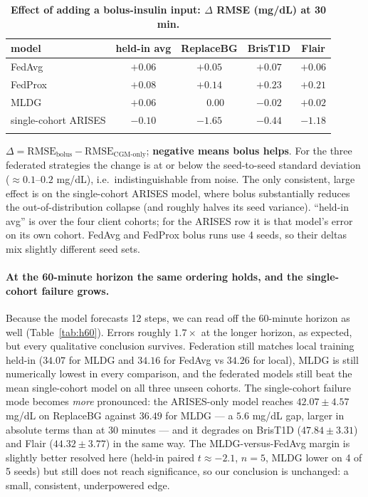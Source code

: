 \documentclass[10pt,letterpaper]{article}
\newlength\savedwidth
\newcommand\thickhline{\noalign{\global\savedwidth\arrayrulewidth\global\arrayrulewidth 2pt}%
\hline
\noalign{\global\arrayrulewidth\savedwidth}}
\begin{document}
\begin{table}[!ht]
\centering
\captionsetup{justification=centering,singlelinecheck=on}
\caption{\bf Effect of adding a bolus-insulin input: $\Delta$ RMSE (mg/dL) at 30 min.}
\label{tab:bolus}
\begin{tabular}{lcccc}
\thickhline
model & held-in avg & ReplaceBG & BrisT1D & Flair \\
\hline
FedAvg  & $+0.06$ & $+0.05$ & $+0.07$ & $+0.06$ \\
FedProx & $+0.08$ & $+0.14$ & $+0.23$ & $+0.21$ \\
MLDG    & $+0.06$ & $\phantom{+}0.00$ & $-0.02$ & $+0.02$ \\
\hline
single-cohort ARISES & $-0.10$ & $\mathbf{-1.65}$ & $\mathbf{-0.44}$ & $\mathbf{-1.18}$ \\
\thickhline
\end{tabular}
\begin{center}
{\small $\Delta = \text{RMSE}_{\text{bolus}} - \text{RMSE}_{\text{CGM-only}}$;
\textbf{negative means bolus helps}. For the three federated strategies the change
is at or below the seed-to-seed standard deviation ($\approx 0.1$--$0.2$ mg/dL),
i.e.\ indistinguishable from noise. The only consistent, large effect is on the
single-cohort ARISES model, where bolus substantially reduces the
out-of-distribution collapse (and roughly halves its seed variance). ``held-in
avg'' is over the four client cohorts; for the ARISES row it is that model's error
on its own cohort. FedAvg and FedProx bolus runs use 4 seeds, so their deltas mix
slightly different seed sets.}
\end{center}
\end{table}

\paragraph{At the 60-minute horizon the same ordering holds, and the
single-cohort failure grows.} Because the model forecasts 12 steps, we can read
off the 60-minute horizon as well (Table~\ref{tab:h60}). Errors roughly
$1.7\times$ at the longer horizon, as expected, but every qualitative conclusion
survives. Federation still matches local training held-in ($34.07$ for MLDG and
$34.16$ for FedAvg vs $34.26$ for local), MLDG is still numerically lowest in
every comparison, and the federated models still beat the mean single-cohort model
on all three unseen cohorts. The single-cohort failure mode becomes \emph{more}
pronounced: the ARISES-only model reaches $42.07 \pm 4.57$ mg/dL on ReplaceBG
against $36.49$ for MLDG --- a $5.6$ mg/dL gap, larger in absolute terms than at
30 minutes --- and it degrades on BrisT1D ($47.84 \pm 3.31$) and Flair
($44.32 \pm 3.77$) in the same way. The MLDG-versus-FedAvg margin is slightly
better resolved here (held-in paired $t \approx -2.1$, $n=5$, MLDG lower on 4 of 5
seeds) but still does not reach significance, so our conclusion is unchanged: a
small, consistent, underpowered edge.
\end{document}
